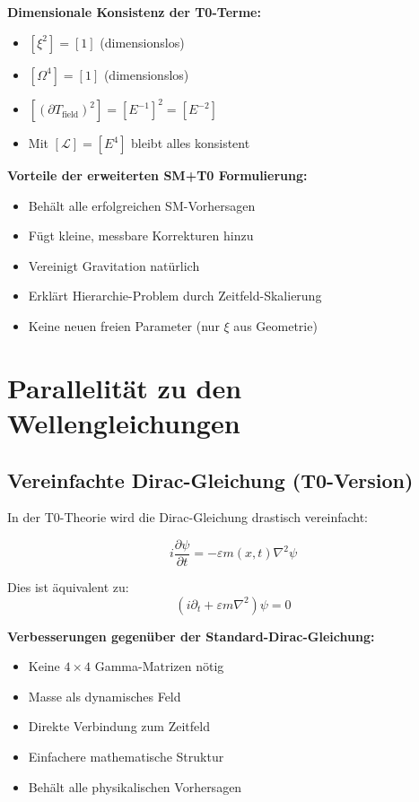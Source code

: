 \documentclass[12pt,a4paper]{article}
\begin{document}
	\textbf{Dimensionale Konsistenz der T0-Terme:}
	\begin{itemize}
		\item $[\xi^2] = [1]$ (dimensionslos)
		\item $[\Omega^4] = [1]$ (dimensionslos)
		\item $[(\partial T_{\text{field}})^2] = [E^{-1}]^2 = [E^{-2}]$
		\item Mit $[\mathcal{L}] = [E^4]$ bleibt alles konsistent
	\end{itemize}
	
	\textbf{Vorteile der erweiterten SM+T0 Formulierung:}
	\begin{itemize}
		\item Behält alle erfolgreichen SM-Vorhersagen
		\item Fügt kleine, messbare Korrekturen hinzu
		\item Vereinigt Gravitation natürlich
		\item Erklärt Hierarchie-Problem durch Zeitfeld-Skalierung
		\item Keine neuen freien Parameter (nur $\xi$ aus Geometrie)
	\end{itemize}
	
	\section{Parallelität zu den Wellengleichungen}
	
	\subsection{Vereinfachte Dirac-Gleichung (T0-Version)}
	
	In der T0-Theorie wird die Dirac-Gleichung drastisch vereinfacht:
	
	\begin{t0box}
		\begin{equation}
			i\frac{\partial\psi}{\partial t} = -\varepsilon m(x,t) \nabla^2 \psi
		\end{equation}
		
		Dies ist äquivalent zu:
		\begin{equation}
			(i\partial_t + \varepsilon m \nabla^2)\psi = 0
		\end{equation}
	\end{t0box}
	
	\textbf{Verbesserungen gegenüber der Standard-Dirac-Gleichung:}
	\begin{itemize}
		\item Keine $4 \times 4$ Gamma-Matrizen nötig
		\item Masse als dynamisches Feld
		\item Direkte Verbindung zum Zeitfeld
		\item Einfachere mathematische Struktur
		\item Behält alle physikalischen Vorhersagen
	\end{itemize}
	
\end{document}
